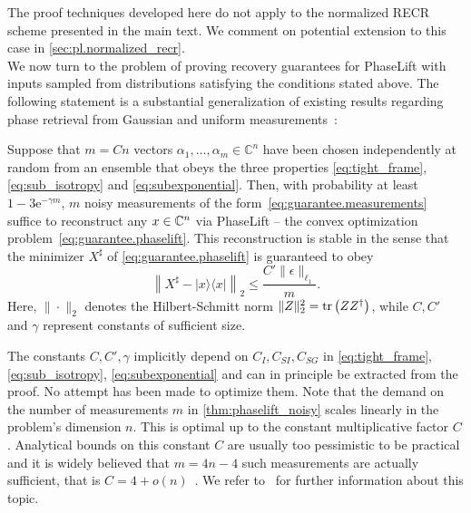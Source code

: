 The proof techniques developed here do not apply to the normalized RECR scheme presented in the main text.
We comment on potential extension to this case in \cref{sec:pl.normalized_recr}.\\

We now turn to the problem of proving recovery guarantees for PhaseLift with inputs sampled from distributions satisfying the conditions stated above.
The following statement is a substantial generalization of existing results regarding phase retrieval from Gaussian and uniform measurements~\cite{candes_solving_2012,demanet_stable_2014}:

\begin{theorem}%
  \label{thm:phaselift_noisy}
  Suppose that $m = Cn$ vectors $\alpha_1,\ldots,\alpha_m \in \mathbb{C}^n$ have been chosen independently at random from an ensemble that obeys the three properties \eqref{eq:tight_frame}, \eqref{eq:sub_isotropy} and \eqref{eq:subexponential}.
  Then, with probability at least $1 - 3\mathrm{e}^{-\gamma m}$,  $m$ noisy measurements of the form~\eqref{eq:guarantee.measurements} suffice to reconstruct any ${x} \in {\mathbb{C}}^n$ via PhaseLift -- the convex optimization problem~\eqref{eq:guarantee.phaselift}.
  This reconstruction is stable in the sense that the minimizer ${X}^\sharp$ of \cref{eq:guarantee.phaselift} is guaranteed to obey
  \begin{equation}
    \left\| {X}^\sharp - |{x} \rangle \! \langle {x}| \right\|_2 \leq \frac{C'  \| \epsilon \|_{\ell_1}}{m}. \label{eq:noisy_recovery_bound}
  \end{equation}
Here, $\| \cdot \|_2$ denotes the Hilbert-Schmitt norm $\| {Z} \|_2^2 = \operatorname{tr} \left( {Z} {Z}^\dagger \right)$, while $C,C'$ and $\gamma$ represent constants of sufficient size.
\end{theorem}

The constants $C,C',\gamma$ implicitly depend on $C_I,C_{SI}, C_{SG}$ in \eqref{eq:tight_frame}, \eqref{eq:sub_isotropy}, \eqref{eq:subexponential} and can in principle be extracted from the proof.
No attempt has been made to optimize them.
Note that the demand on the number of measurements $m$ in \cref{thm:phaselift_noisy} scales linearly in the problem's dimension $n$.
This is optimal up to the constant multiplicative factor $C$.
Analytical bounds on this constant $C$ are usually too pessimistic to be practical and it is widely believed that
\(
  m = 4n - 4
\)
such measurements are actually sufficient, that is $C = 4 + o(n)$~\cite{heinosaari_quantum_2013}.
We refer to~\cite{MixonBlog} for further information about this topic.

